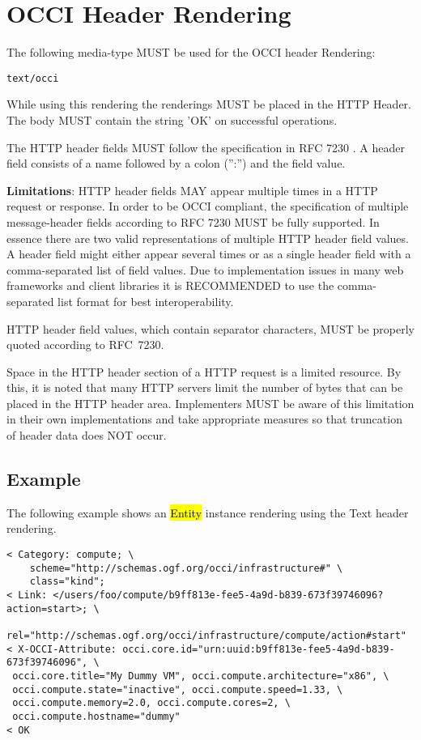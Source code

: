 \documentclass[10pt,a4paper]{article}
\begin{document}
\section{OCCI Header Rendering}
\label{sec:header}
The following media-type MUST be used for the OCCI header Rendering:

{\tt text/occi}

While using this rendering the renderings MUST be placed in the HTTP Header. The body MUST contain the string ’OK’ on successful operations.

The HTTP header fields MUST follow the specification in RFC 7230 \cite{rfc7230}. A header field consists of a name followed by a colon (”:”) and the field value.

\textbf{Limitations}: HTTP header fields MAY appear multiple times in a HTTP request or response. In order to be OCCI compliant, the specification of multiple message-header fields according to RFC 7230 MUST be fully supported. In essence there are two valid representations of multiple HTTP header field values. A header field might either appear several times or as a single header field with a comma-separated list of field values. Due to implementation issues in many web frameworks and client libraries it is RECOMMENDED to use the comma-separated list format for best interoperability.

HTTP header field values, which contain separator characters, MUST be properly quoted according to RFC~7230.

Space in the HTTP header section of a HTTP request is a limited resource. By this, it is noted that many HTTP servers limit the number of bytes that can be placed in the HTTP header area. Implementers MUST be aware of this limitation in their own implementations and take appropriate measures so that truncation of header data does NOT occur.

\subsection{Example}

The following example shows an \hl{Entity} instance rendering using the Text header rendering.

\begin{verbatim}
< Category: compute; \
    scheme="http://schemas.ogf.org/occi/infrastructure#" \
    class="kind";
< Link: </users/foo/compute/b9ff813e-fee5-4a9d-b839-673f39746096?action=start>; \
    rel="http://schemas.ogf.org/occi/infrastructure/compute/action#start"
< X-OCCI-Attribute: occi.core.id="urn:uuid:b9ff813e-fee5-4a9d-b839-673f39746096", \
 occi.core.title="My Dummy VM", occi.compute.architecture="x86", \
 occi.compute.state="inactive", occi.compute.speed=1.33, \
 occi.compute.memory=2.0, occi.compute.cores=2, \
 occi.compute.hostname="dummy"
< OK
\end{verbatim}
\end{document}
